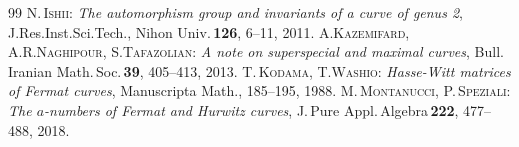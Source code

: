 \documentclass{article}
\theoremstyle{definition}
\begin{document}
\begin{thebibliography}{99}
 \textsc{N.\,Ishii}: \textit{The automorphism group and invariants of a curve of genus 2}, J.\hspace{0.8mm}Res.\hspace{0.8mm}Inst.\hspace{0.8mm}Sci.\hspace{0.8mm}Tech., Nihon Univ.\,{\bf 126}, 6--11, 2011.\vspace{-1mm}
 \textsc{A\hspace{-0.2mm}.\hspace{0.6mm}Kazemifard, A.\hspace{0.5mm}R.\hspace{0.5mm}Naghipour, S.\hspace{0.3mm}Tafazolian}: \textit{A note on superspecial and maximal curves}, Bull. Iranian Math.\,Soc.\,{\bf 39}, 405--413, 2013.\vspace{-1mm}
 \textsc{T\hspace{-0.2mm}.\,Kodama, \hspace{-0.2mm}T\hspace{-0.2mm}.\hspace{0.5mm}Washio}: \textit{Hasse-Witt matrices of Fermat curves}, Manuscripta Math.\hspace{0.5mm}{\bf 60}, 185--195, 1988.\vspace{-1mm}
 \textsc{M\hspace{-0.1mm}.\,Montanucci, P\hspace{-0.4mm}.\,Speziali}: \hspace{-0.3mm}\textit{The $a$-numbers of Fermat and Hurwitz curves}, J\hspace{-0.2mm}.\,Pure \hspace{-0.2mm}Appl.\,Algebra\,{\bf 222}, 477--488, 2018.\vspace{-1mm}

\end{thebibliography}
\end{document}
